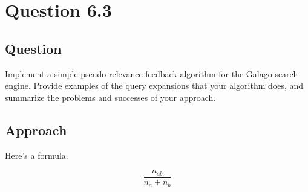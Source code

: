 \section{Question 6.3}

\subsection{Question}
Implement a simple pseudo-relevance feedback algorithm for the Galago
search engine. Provide examples of the query expansions that your algorithm does,
and summarize the problems and successes of your approach.


\subsection{Approach}
Here's a formula.

\[\frac{n_{ab}}{n_a + n_b}\]